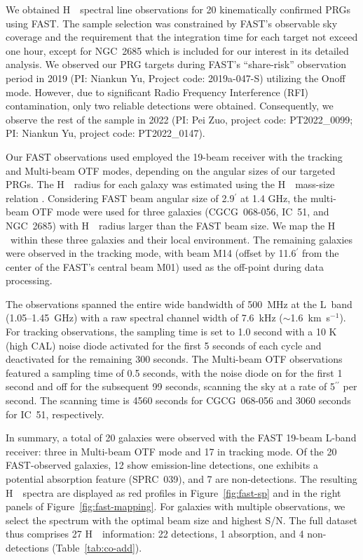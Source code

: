 \documentclass[twocolumn]{aastex631}
\def\HI{H\,  {\textsc{\romannumeral 1}}}
\begin{document}
We obtained \HI\ spectral line observations for 20 kinematically confirmed PRGs using FAST. The sample selection was constrained by FAST's observable sky coverage and the requirement that the integration time for each target not exceed one hour, except for NGC~2685 which is included for our interest in its detailed analysis. We observed our PRG targets during FAST's ``share-risk'' observation period in 2019 (PI: Niankun Yu, Project code: 2019a-047-S) utilizing the Onoff mode. However, due to significant Radio Frequency Interference (RFI) contamination, only two reliable detections were obtained. Consequently, we observe the rest of the sample in 2022 (PI: Pei Zuo, project code: PT2022\_0099; PI: Niankun Yu, project code: PT2022\_0147).

Our FAST observations used employed the 19-beam receiver with the tracking and Multi-beam OTF modes, depending on the angular sizes of our targeted PRGs. The \HI\ radius for each galaxy was estimated using the \HI\ mass-size relation \citep{Broeils1997A&A...324..877B, Wang2016MNRAS.460.2143W}. Considering FAST beam angular size of 2.9$^{\prime}$ at 1.4 GHz, the multi-beam OTF mode were used for three galaxies (CGCG~068-056, IC~51, and NGC~2685) with \HI\ radius larger than the FAST beam size. We map the \HI\ within these three galaxies and their local environment. 
The remaining galaxies were observed in the tracking mode, with beam M14 (offset by 11.6$^{\prime}$ from the center of the FAST's central beam M01) used as the off-point during data processing.

The observations spanned the entire wide bandwidth of 500~MHz at the L~band (1.05--1.45~GHz) with a raw spectral channel width of 7.6~kHz ($\sim$1.6~km~s$^{-1}$). For tracking observations, the sampling time is set to 1.0 second with a 10 K (high CAL) noise diode activated for the first 5 seconds of each cycle and deactivated for the remaining 300 seconds. The Multi-beam OTF observations featured a sampling time of 0.5 seconds, with the noise diode on for the first 1 second and off for the subsequent 99 seconds, scanning the sky at a rate of 5$^{\prime\prime}$ per second. The scanning time is 4560 seconds for CGCG~068-056 and 3060 seconds for IC~51, respectively.

In summary, a total of 20 galaxies were observed with the FAST 19-beam L-band receiver: three in Multi-beam OTF mode and 17 in tracking mode. 
Of the 20 FAST-observed galaxies, 12 show emission-line detections, one exhibits a potential absorption feature (SPRC~039), and 7 are non-detections. The resulting \HI\ spectra are displayed as red profiles in Figure~\ref{fig:fast-sp} and in the right panels of Figure~\ref{fig:fast-mapping}.
For galaxies with multiple observations, we select the spectrum with the optimal beam size and highest S/N. The full dataset thus comprises 27 \HI\ information: 22 detections, 1 absorption, and 4 non-detections (Table~\ref{tab:co-add}).
\end{document}
